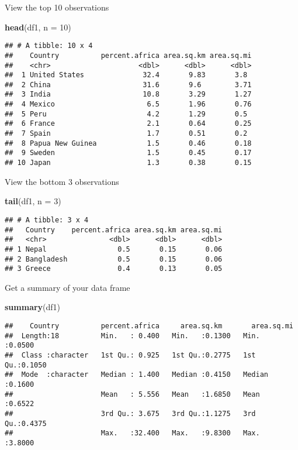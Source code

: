 \documentclass[
]{article}
\newenvironment{Shaded}{\begin{snugshade}}{\end{snugshade}}
\newcommand{\AttributeTok}[1]{\textcolor[rgb]{0.13,0.29,0.53}{#1}}
\newcommand{\DecValTok}[1]{\textcolor[rgb]{0.00,0.00,0.81}{#1}}
\newcommand{\FunctionTok}[1]{\textcolor[rgb]{0.13,0.29,0.53}{\textbf{#1}}}
\newcommand{\NormalTok}[1]{#1}
\begin{document}
View the top 10 observations

\begin{Shaded}
\begin{Highlighting}[]
\FunctionTok{head}\NormalTok{(df1, }\AttributeTok{n =} \DecValTok{10}\NormalTok{)}
\end{Highlighting}
\end{Shaded}

\begin{verbatim}
## # A tibble: 10 x 4
##    Country          percent.africa area.sq.km area.sq.mi
##    <chr>                     <dbl>      <dbl>      <dbl>
##  1 United States              32.4       9.83       3.8 
##  2 China                      31.6       9.6        3.71
##  3 India                      10.8       3.29       1.27
##  4 Mexico                      6.5       1.96       0.76
##  5 Peru                        4.2       1.29       0.5 
##  6 France                      2.1       0.64       0.25
##  7 Spain                       1.7       0.51       0.2 
##  8 Papua New Guinea            1.5       0.46       0.18
##  9 Sweden                      1.5       0.45       0.17
## 10 Japan                       1.3       0.38       0.15
\end{verbatim}

View the bottom 3 observations

\begin{Shaded}
\begin{Highlighting}[]
\FunctionTok{tail}\NormalTok{(df1, }\AttributeTok{n =} \DecValTok{3}\NormalTok{)}
\end{Highlighting}
\end{Shaded}

\begin{verbatim}
## # A tibble: 3 x 4
##   Country    percent.africa area.sq.km area.sq.mi
##   <chr>               <dbl>      <dbl>      <dbl>
## 1 Nepal                 0.5       0.15       0.06
## 2 Bangladesh            0.5       0.15       0.06
## 3 Greece                0.4       0.13       0.05
\end{verbatim}

Get a summary of your data frame

\begin{Shaded}
\begin{Highlighting}[]
\FunctionTok{summary}\NormalTok{(df1)}
\end{Highlighting}
\end{Shaded}

\begin{verbatim}
##    Country          percent.africa     area.sq.km       area.sq.mi    
##  Length:18          Min.   : 0.400   Min.   :0.1300   Min.   :0.0500  
##  Class :character   1st Qu.: 0.925   1st Qu.:0.2775   1st Qu.:0.1050  
##  Mode  :character   Median : 1.400   Median :0.4150   Median :0.1600  
##                     Mean   : 5.556   Mean   :1.6850   Mean   :0.6522  
##                     3rd Qu.: 3.675   3rd Qu.:1.1275   3rd Qu.:0.4375  
##                     Max.   :32.400   Max.   :9.8300   Max.   :3.8000
\end{verbatim}
\end{document}
